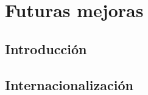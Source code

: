 \chapter{Futuras mejoras} \label{cap: mejoras}





\section{Introducción}





\section{Internacionalización}




